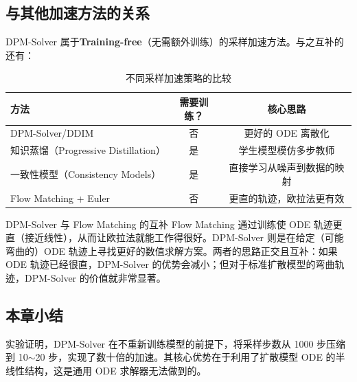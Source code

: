 \subsection{与其他加速方法的关系}

DPM-Solver 属于\textbf{Training-free}（无需额外训练）的采样加速方法。与之互补的还有：

\begin{table}[H]
\centering
\begin{tabular}{lcc}
\toprule
\textbf{方法} & \textbf{需要训练？} & \textbf{核心思路} \\
\midrule
DPM-Solver/DDIM & 否 & 更好的 ODE 离散化 \\
知识蒸馏（Progressive Distillation） & 是 & 学生模型模仿多步教师 \\
一致性模型（Consistency Models） & 是 & 直接学习从噪声到数据的映射 \\
Flow Matching + Euler & 否 & 更直的轨迹，欧拉法更有效 \\
\bottomrule
\end{tabular}
\caption{不同采样加速策略的比较}
\end{table}

\begin{knowledgebox}{DPM-Solver 与 Flow Matching 的互补}
Flow Matching 通过训练使 ODE 轨迹更直（接近线性），从而让欧拉法就能工作得很好。DPM-Solver 则是在给定（可能弯曲的）ODE 轨迹上寻找更好的数值求解方案。两者的思路正交且互补：如果 ODE 轨迹已经很直，DPM-Solver 的优势会减小；但对于标准扩散模型的弯曲轨迹，DPM-Solver 的价值就非常显著。
\end{knowledgebox}

\subsection{本章小结}

实验证明，DPM-Solver 在不重新训练模型的前提下，将采样步数从 1000 步压缩到 10$\sim$20 步，实现了数十倍的加速。其核心优势在于利用了扩散模型 ODE 的半线性结构，这是通用 ODE 求解器无法做到的。


